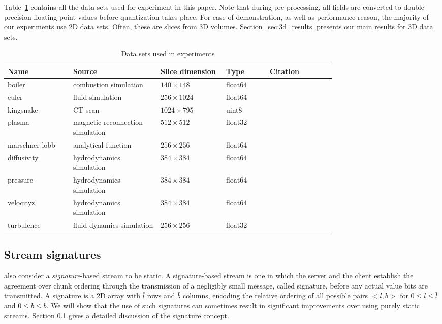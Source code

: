 Table~\ref{tbl:data-sets} contains all the data sets used for experiment in this paper. Note that
during pre-processing, all fields are converted to double-precision floating-point values before
quantization takes place. For ease of demonstration, as well as performance reason, the majority of
our experiments use 2D data sets. Often, these are slices from 3D volumes.
Section~\ref{sec:3d_results} presents our main results for 3D data sets. 

\begin{table}[t]
  \caption{Data sets used in experiments}
  \centering
  \begin{tabular}{p{0.15\linewidth}p{0.20\linewidth}p{0.15\linewidth}p{0.10\linewidth}p{0.15\linewidth}}
  \hline
  Name & Source & Slice dimension & Type & Citation\\
  \hline
  boiler & combustion simulation& $140\times 148$ & float64 &\\
  euler & fluid simulation& $256\times 1024$ & float64 &\\
  kingsnake & CT scan & $1024\times 795$ & uint8 &\\
  plasma & magnetic reconnection simulation& $512\times 512$ & float32 &\\
  marschner-lobb & analytical function& $256\times 256$ & float64 &\\
  diffusivity & hydrodynamics simulation& $384\times 384$ & float64 &\\
  pressure & hydrodynamics simulation& $384\times 384$ & float64 &\\
  velocityz & hydrodynamics simulation& $384\times 384$ & float64 &\\
  turbulence & fluid dynamics simulation& $256\times 256$ & float32 &\\
  \hline
  \end{tabular}
\label{tbl:data-sets}
\end{table}

\subsection{Stream signatures}
\label{sec:stream-signature}

also consider a \emph{signature}-based stream to be static. A signature-based stream is one in which
the server and the client establish the agreement over chunk ordering through the transmission of a
negligibly small message, called signature, before any actual value bits are transmitted. A
signature is a 2D array with $\bar{l}$ rows and $\bar{b}$ columns, encoding the relative ordering of
all possible pairs $<l,b>$ for $0\leq l \leq \bar{l}$ and $0\leq b \leq \bar{b}$. We will show that
the use of such signatures can sometimes result in significant improvements over using purely static
streams. Section \ref{sec:stream-signature} gives a detailed discussion of the signature concept.

